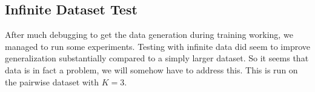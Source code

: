 \documentclass[a4paper]{article}
\begin{document}
\subsection*{Infinite Dataset Test}
After much debugging to get the data generation during training working, we managed to run some experiments.
Testing with infinite data did seem to improve generalization substantially compared to a simply larger dataset.
So it seems that data is in fact a problem, we will somehow have to address this. 
This is run on the pairwise dataset with $K=3$.
\begin{figure}[H]
    \begin{minipage}{.45\linewidth}
        \centering
    \end{minipage}
    \begin{minipage}{.45\linewidth}
        \centering

\end{minipage}
\end{figure}
\end{document}
